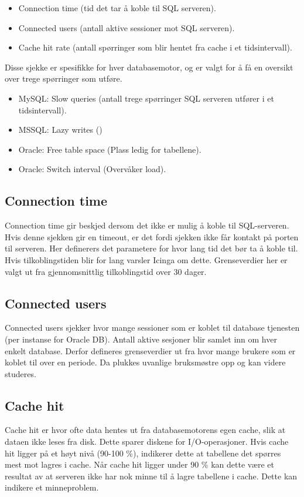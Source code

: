 \begin{itemize}
	\item Connection time (tid det tar å koble til SQL serveren).
	\item Connected users (antall aktive sessioner mot SQL serveren).
	\item Cache hit rate (antall spørringer som blir hentet fra cache i et tidsintervall).
\end{itemize}

Disse sjekke er spesifikke for hver databasemotor, og er valgt for å få en oversikt over trege spørringer som utføre.

\begin{itemize}
\item MySQL: Slow queries (antall trege spørringer SQL serveren utfører i et tidsintervall).
\item MSSQL: Lazy writes ()
\item Oracle: Free table space (Plass ledig for tabellene).
\item Oracle: Switch interval (Overvåker load).
\end{itemize}

\subsection*{Connection time}
Connection time gir beskjed dersom det ikke er mulig å koble til SQL-serveren. Hvis denne sjekken gir en timeout, er det fordi sjekken ikke får kontakt på porten til serveren. Her definerers det parametere for hvor lang tid det bør ta å koble til. Hvis tilkoblingstiden blir for lang varsler Icinga om dette. Grenseverdier her er valgt ut fra gjennomsnittlig tilkoblingstid over 30 dager.

\subsection*{Connected users}
Connected users sjekker hvor mange sessioner som er koblet til database tjenesten (per instanse for Oracle DB). Antall aktive sesjoner blir samlet inn om hver enkelt database. Derfor defineres grenseverdier ut fra hvor mange brukere som er koblet til over en periode. Da plukkes uvanlige bruksmøstre opp og kan videre studeres.

\subsection*{Cache hit}
Cache hit er hvor ofte data hentes ut fra databasemotorens egen cache, slik at dataen ikke leses fra disk. Dette sparer diskene for I/O-operasjoner. Hvis cache hit ligger på et høyt nivå (90-100 \%), indikerer dette at tabellene det spørres mest mot lagres i cache. Når cache hit ligger under 90 \% kan dette være et resultat av at serveren ikke har nok minne til å lagre tabellene i cache. Dette kan indikere et minneproblem.

